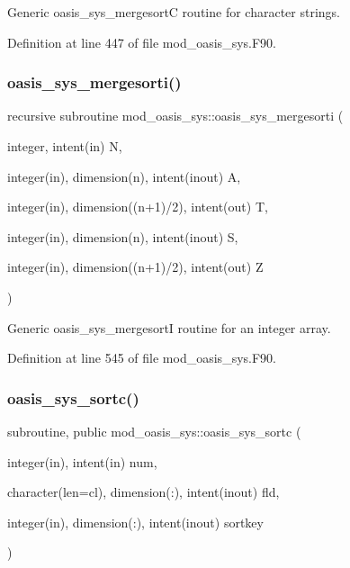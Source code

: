 Generic oasis\+\_\+sys\+\_\+mergesortC routine for character strings. 



Definition at line 447 of file mod\+\_\+oasis\+\_\+sys.\+F90.

\mbox{\label{namespacemod__oasis__sys_a298b27e03ff339d56eda3c5b31115781}} 
\subsubsection{\texorpdfstring{oasis\+\_\+sys\+\_\+mergesorti()}{oasis\_sys\_mergesorti()}}
{\footnotesize\ttfamily recursive subroutine mod\+\_\+oasis\+\_\+sys\+::oasis\+\_\+sys\+\_\+mergesorti (\begin{DoxyParamCaption}\item[{integer, intent(in)}]{N,  }\item[{integer(in), dimension(n), intent(inout)}]{A,  }\item[{integer(in), dimension((n+1)/2), intent(out)}]{T,  }\item[{integer(in), dimension(n), intent(inout)}]{S,  }\item[{integer(in), dimension((n+1)/2), intent(out)}]{Z }\end{DoxyParamCaption})\hspace{0.3cm}{\ttfamily [private]}}



Generic oasis\+\_\+sys\+\_\+mergesortI routine for an integer array. 



Definition at line 545 of file mod\+\_\+oasis\+\_\+sys.\+F90.

\mbox{\label{namespacemod__oasis__sys_ab2aa592727d1e5bea728281679d5ca8d}} 
\subsubsection{\texorpdfstring{oasis\+\_\+sys\+\_\+sortc()}{oasis\_sys\_sortc()}}
{\footnotesize\ttfamily subroutine, public mod\+\_\+oasis\+\_\+sys\+::oasis\+\_\+sys\+\_\+sortc (\begin{DoxyParamCaption}\item[{integer(in), intent(in)}]{num,  }\item[{character(len=cl), dimension(\+:), intent(inout)}]{fld,  }\item[{integer(in), dimension(\+:), intent(inout)}]{sortkey }\end{DoxyParamCaption})}



